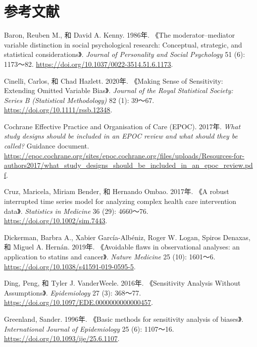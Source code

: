 \documentclass[
  chinese-hans,
  letterpaper,
  DIV=11,
  numbers=noendperiod]{scrreprt}
\newlength{\cslhangindent}
\newenvironment{CSLReferences}[2] %
 {\begin{list}{}{%
  \setlength{\itemindent}{0pt}
  \setlength{\leftmargin}{0pt}
  \setlength{\parsep}{0pt}
  \ifodd #1
   \setlength{\leftmargin}{\cslhangindent}
   \setlength{\itemindent}{-1\cslhangindent}
  \fi
  \setlength{\itemsep}{#2\baselineskip}}}
 {\end{list}}
\begin{document}
\section*{参考文献}\label{ux53c2ux8003ux6587ux732e-11}


\protect{}\label{refs}
\begin{CSLReferences}{1}{1}
Baron, Reuben M., 和 David A. Kenny. 1986年. {《The moderator--mediator
variable distinction in social psychological research: Conceptual,
strategic, and statistical considerations》}. \emph{Journal of
Personality and Social Psychology} 51 (6): 1173～82.
\url{https://doi.org/10.1037/0022-3514.51.6.1173}.

Cinelli, Carlos, 和 Chad Hazlett. 2020年. {《Making Sense of
Sensitivity: Extending Omitted Variable Bias》}. \emph{Journal of the
Royal Statistical Society: Series B (Statistical Methodology)} 82 (1):
39～67. \url{https://doi.org/10.1111/rssb.12348}.

Cochrane Effective Practice and Organisation of Care (EPOC). 2017年.
\emph{What study designs should be included in an {EPOC} review and what
should they be called?} Guidance document.
\url{https://epoc.cochrane.org/sites/epoc.cochrane.org/files/uploads/Resources-for-authors2017/what_study_designs_should_be_included_in_an_epoc_review.pdf}.

Cruz, Maricela, Miriam Bender, 和 Hernando Ombao. 2017年. {《A robust
interrupted time series model for analyzing complex health care
intervention data》}. \emph{Statistics in Medicine} 36 (29): 4660～76.
\url{https://doi.org/10.1002/sim.7443}.

Dickerman, Barbra A., Xabier García-Albéniz, Roger W. Logan, Spiros
Denaxas, 和 Miguel A. Hernán. 2019年. {《Avoidable flaws in
observational analyses: an application to statins and cancer》}.
\emph{Nature Medicine} 25 (10): 1601～6.
\url{https://doi.org/10.1038/s41591-019-0595-5}.

Ding, Peng, 和 Tyler J. VanderWeele. 2016年. {《Sensitivity Analysis
Without Assumptions》}. \emph{Epidemiology} 27 (3): 368～77.
\url{https://doi.org/10.1097/EDE.0000000000000457}.

Greenland, Sander. 1996年. {《Basic methods for sensitivity analysis of
biases》}. \emph{International Journal of Epidemiology} 25 (6):
1107～16. \url{https://doi.org/10.1093/ije/25.6.1107}.


\end{CSLReferences}
\end{document}
